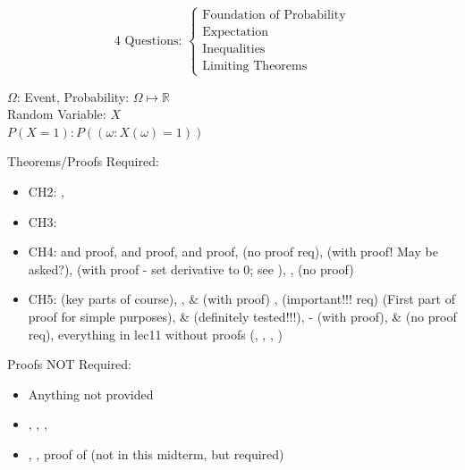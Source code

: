 
 
\[\text{4 Questions: }\begin{cases}
    \text{Foundation of Probability}\\
    \text{Expectation}\\
    \text{Inequalities}\\
    \text{Limiting Theorems}
\end{cases}\]

\begin{center}
    $\Omega$: Event, Probability: $\Omega \mapsto \mathbb{R}$
    \\Random Variable: $X$
    \\$P(X=1): P(\left(\omega: X(\omega) = 1\right))$
\end{center}

\hypertarget{req:list}{}
Theorems/Proofs Required:
\begin{itemize}
    \item CH2: , 
    \item CH3: 
    \item CH4:  and proof,  and proof,  and proof,  (no proof req),  (with proof! May be asked?),  (with proof - set derivative to 0; see ), ,  (no proof)
    \item CH5:  (key parts of course), ,  \& (with proof) ,  (important!!! req) (First part of proof for simple purposes),  \&  (definitely tested!!!),  -  (with proof),  \&  (no proof req), everything in lec11 without proofs (, , , )
\end{itemize}

Proofs NOT Required:
\begin{itemize}
    \item Anything not provided
    \item {}, , ,
    \item {}, , proof of (not in this midterm, but required)
\end{itemize}

